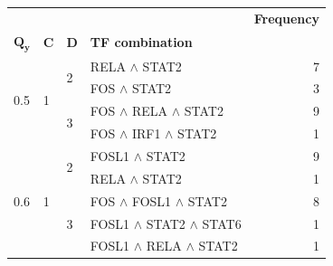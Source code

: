 \begin{tabular}{llllr}
\toprule
 &  &  &  & \textbf{Frequency} \\
$\mathbf{Q_y}$ & $\mathbf{C}$ & $\mathbf{D}$ & \textbf{TF combination} &  \\
\midrule
\multirow[t]{4}{*}{0.5} & \multirow[t]{4}{*}{1} & \multirow[t]{2}{*}{2} & {RELA $\wedge$ STAT2} & 7 \\
 &  &  & {FOS $\wedge$ STAT2} & 3 \\
\cline{3-5}
 &  & \multirow[t]{2}{*}{3} & {FOS $\wedge$ RELA $\wedge$ STAT2} & 9 \\
 &  &  & {FOS $\wedge$ IRF1 $\wedge$ STAT2} & 1 \\
\cline{1-5} \cline{2-5} \cline{3-5}
\multirow[t]{5}{*}{0.6} & \multirow[t]{5}{*}{1} & \multirow[t]{2}{*}{2} & {FOSL1 $\wedge$ STAT2} & 9 \\
 &  &  & {RELA $\wedge$ STAT2} & 1 \\
\cline{3-5}
 &  & \multirow[t]{3}{*}{3} & {FOS $\wedge$ FOSL1 $\wedge$ STAT2} & 8 \\
 &  &  & {FOSL1 $\wedge$ STAT2 $\wedge$ STAT6} & 1 \\
 &  &  & {FOSL1 $\wedge$ RELA $\wedge$ STAT2} & 1 \\
\cline{1-5} \cline{2-5} \cline{3-5}
\bottomrule
\end{tabular}
